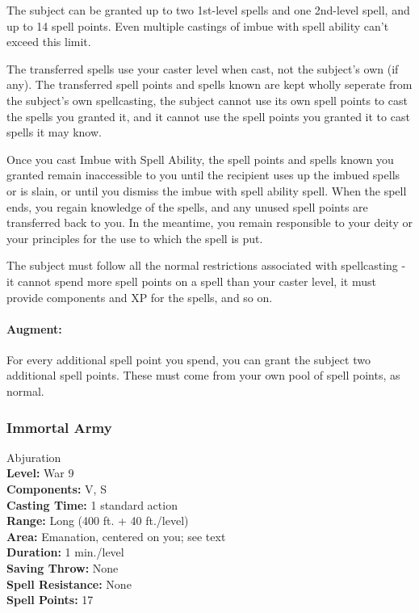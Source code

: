 The subject can be granted up to two 1st-level spells and one 2nd-level spell, and up to 14 spell points. 
Even multiple castings of imbue with spell ability can't exceed this limit.

The transferred spells use your caster level when cast, not the subject's own (if any).
The transferred spell points and spells known are kept wholly seperate from the subject's own spellcasting,
the subject cannot use its own spell points to cast the spells you granted it, and it cannot use the spell points you granted it to cast spells it may know.

Once you cast Imbue with Spell Ability, 
the spell points and spells known you granted remain inaccessible to you until the recipient uses up the imbued spells or is slain, 
or until you dismiss the imbue with spell ability spell.
When the spell ends, you regain knowledge of the spells, and any unused spell points are transferred back to you.
In the meantime, you remain responsible to your deity or your principles for the use to which the spell is put. 

The subject must follow all the normal restrictions associated with spellcasting - it cannot spend more spell points on a spell than your caster level,
it must provide components and XP for the spells, and so on.

\paragraph{Augment:} For every additional spell point you spend, you can grant the subject two additional spell points.
These must come from your own pool of spell points, as normal.
\subsubsection{Immortal Army}
\label{Spell:ImmortalArmy}
Abjuration
\\ \textbf{Level:} War 9
\\ \textbf{Components:} V, S
\\ \textbf{Casting Time:} 1 standard action
\\ \textbf{Range:} Long (400 ft. + 40 ft./level)
\\ \textbf{Area:} Emanation, centered on you; see text
\\ \textbf{Duration:} 1 min./level
\\ \textbf{Saving Throw:} None
\\ \textbf{Spell Resistance:} None
\\ \textbf{Spell Points:} 17

